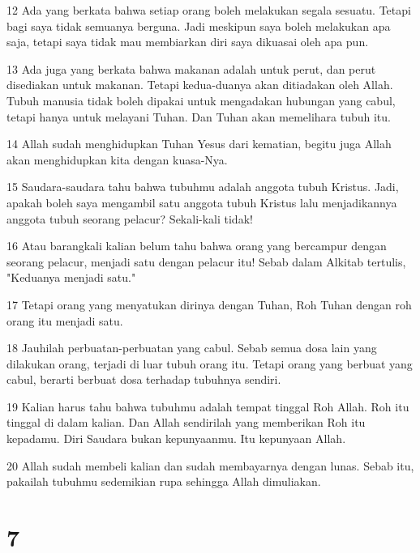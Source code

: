 \par 12 Ada yang berkata bahwa setiap orang boleh melakukan segala sesuatu. Tetapi bagi saya tidak semuanya berguna. Jadi meskipun saya boleh melakukan apa saja, tetapi saya tidak mau membiarkan diri saya dikuasai oleh apa pun.
\par 13 Ada juga yang berkata bahwa makanan adalah untuk perut, dan perut disediakan untuk makanan. Tetapi kedua-duanya akan ditiadakan oleh Allah. Tubuh manusia tidak boleh dipakai untuk mengadakan hubungan yang cabul, tetapi hanya untuk melayani Tuhan. Dan Tuhan akan memelihara tubuh itu.
\par 14 Allah sudah menghidupkan Tuhan Yesus dari kematian, begitu juga Allah akan menghidupkan kita dengan kuasa-Nya.
\par 15 Saudara-saudara tahu bahwa tubuhmu adalah anggota tubuh Kristus. Jadi, apakah boleh saya mengambil satu anggota tubuh Kristus lalu menjadikannya anggota tubuh seorang pelacur? Sekali-kali tidak!
\par 16 Atau barangkali kalian belum tahu bahwa orang yang bercampur dengan seorang pelacur, menjadi satu dengan pelacur itu! Sebab dalam Alkitab tertulis, "Keduanya menjadi satu."
\par 17 Tetapi orang yang menyatukan dirinya dengan Tuhan, Roh Tuhan dengan roh orang itu menjadi satu.
\par 18 Jauhilah perbuatan-perbuatan yang cabul. Sebab semua dosa lain yang dilakukan orang, terjadi di luar tubuh orang itu. Tetapi orang yang berbuat yang cabul, berarti berbuat dosa terhadap tubuhnya sendiri.
\par 19 Kalian harus tahu bahwa tubuhmu adalah tempat tinggal Roh Allah. Roh itu tinggal di dalam kalian. Dan Allah sendirilah yang memberikan Roh itu kepadamu. Diri Saudara bukan kepunyaanmu. Itu kepunyaan Allah.
\par 20 Allah sudah membeli kalian dan sudah membayarnya dengan lunas. Sebab itu, pakailah tubuhmu sedemikian rupa sehingga Allah dimuliakan.

\chapter{7}

